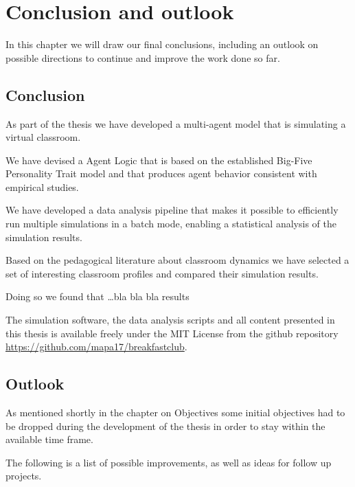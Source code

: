 \chapter{Conclusion and outlook}
In this chapter we will draw our final conclusions, including an outlook on
possible directions to continue and improve the work done so far.

\section{Conclusion}
As part of the thesis we have developed a multi-agent model that is simulating a virtual classroom.

We have devised a Agent Logic that is based on the established Big-Five Personality
Trait model and that produces agent behavior consistent with empirical studies.

We have developed a data analysis pipeline that makes it possible to efficiently
run multiple simulations in a batch mode, enabling a statistical analysis of the
simulation results.

Based on the pedagogical literature about classroom dynamics we have selected a
set of interesting classroom profiles and compared their simulation results.

Doing so we found that \dots bla bla bla results

The simulation software, the data analysis scripts and all content presented in this
thesis is available freely under the MIT License from the github repository \href{https://github.com/mapa17/breakfastclub}{https://github.com/mapa17/breakfastclub}.



\section{Outlook}
As mentioned shortly in the chapter on Objectives some initial objectives had to
be dropped during the development of the thesis in order to stay within the available
time frame.

The following is a list of possible improvements, as well as ideas for follow up projects.

